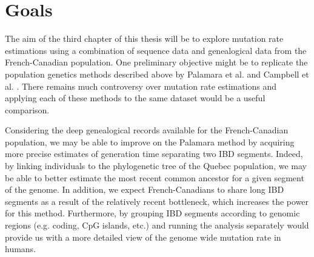 \documentclass[
11pt, %
oneside, %
english, %
doublespacing, %
headsepline, %
chapterinoneline, %
]{MastersDoctoralThesis} %
\begin{document}
\section{Goals}
The aim of the third chapter of this thesis will be to explore mutation rate estimations using a combination of sequence data and genealogical data from the French-Canadian population.
One preliminary objective might be to replicate the population genetics methods described above by Palamara et al. and Campbell et al. \citep{Palamara2015,Campbell2012}.
There remains much controversy over mutation rate estimations and applying each of these methods to the same dataset would be a useful comparison.

Considering the deep genealogical records available for the French-Canadian population, we may be able to improve on the Palamara method by acquiring more precise estimates of generation time separating two IBD segments.
Indeed, by linking individuals to the phylogenetic tree of the Quebec population, we may be able to better estimate the most recent common ancestor for a given segment of the genome.
In addition, we expect French-Canadians to share long IBD segments as a result of the relatively recent bottleneck, which increases the power for this method.
Furthermore, by grouping IBD segments according to genomic regions (e.g. coding, CpG islands, etc.) and running the analysis separately would provide us with a more detailed view of the genome wide mutation rate in humans.


\clearpage
\appendix %
\end{document}
